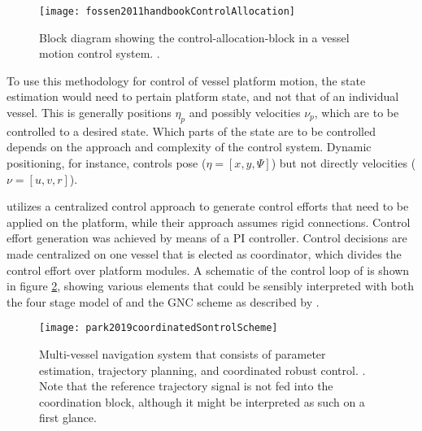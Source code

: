 \begin{figure}[h!]
 	\centering
 	\texttt{[image: fossen2011handbookControlAllocation]}
 	\caption{Block diagram showing the control-allocation-block in a vessel motion control system. \cite{fossen2011handbook}.}
 	\label{fig:fossenControlAllocationPNG}
 \end{figure}
 
To use this methodology for control of vessel platform motion, the state estimation would need to pertain platform state, and not that of an individual vessel. This is generally positions $\eta_p$ and possibly velocities $\nu_p$, which are to be controlled to a desired state. Which parts of the state are to be controlled depends on the approach and complexity of the control system. Dynamic positioning, for instance, controls pose ($\eta = [x,y,\Psi]$) but not directly velocities ($\nu = [u,v,r]$).

\citet{park2019coordinated} utilizes a centralized control approach to generate control efforts that need to be applied on the platform, while their approach assumes rigid connections. Control effort generation was achieved by means of a PI controller. Control decisions are made centralized on one vessel that is elected as coordinator, which divides the control effort over platform modules. A schematic of the control loop of \citet{park2019coordinated} is  shown in figure \ref{fig:park2019coordinatedSontrolScheme}, showing various elements that could be sensibly interpreted with both the four stage model of \citet{parasuraman2000model} and the GNC scheme as described by \citet{fossen2011handbook}.

\begin{figure}[H]
	\centering
	\texttt{[image: park2019coordinatedSontrolScheme]}
	\caption{Multi-vessel navigation system that consists of parameter estimation, trajectory planning, and coordinated robust control. \cite{park2019coordinated}. Note that the reference trajectory signal is not fed into the coordination block, although it might be interpreted as such on a first glance.}
	\label{fig:park2019coordinatedSontrolScheme}
\end{figure}